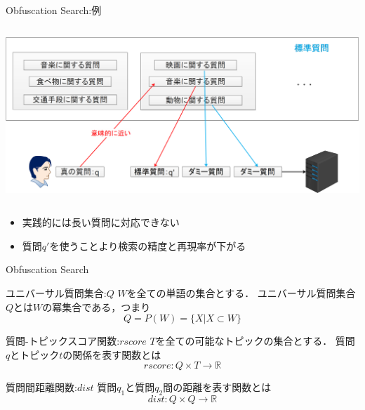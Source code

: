 \documentclass[14pt,xcolor=dvipsnames,table,dvipdfmx]{beamer}
\begin{document}
\begin{frame}{Obfuscation Search:例}
    \begin{columns}[t]
        \begin{column}{1\textwidth} %
            \includegraphics[width=\columnwidth]{rk14.png}
		\end{column}
    \end{columns}
	\begin{block}{} 
		\begin{itemize}
			\item 実践的には長い質問に対応できない
			\item 質問$q'$を使うことより検索の精度と再現率が下がる
		\end{itemize}
	\end{block}
\end{frame}

\begin{frame}{Obfuscation Search}
\fontsize{12pt}{7.2}\selectfont
    \begin{block}{ユニバーサル質問集合:$Q$}
		$W$を全ての単語の集合とする．
		ユニバーサル質問集合$Q$とは$W$の冪集合である，つまり
		\begin{equation}
		Q = P(W) = \{X|X \subset W\}
		\end{equation}
    \end{block}
    \begin{block}{質問-トピックスコア関数:$rscore$}
		$T$を全ての可能なトピックの集合とする．
		質問$q$とトピック$t$の関係を表す関数とは
		\begin{equation}
		rscore:Q \times T \to \mathbb{R}
		\end{equation}
    \end{block}
    \begin{block}{質問間距離関数:$dist$}
		質問$q_1$と質問$q_2$間の距離を表す関数とは
		\begin{equation}
		dist:Q \times Q \to \mathbb{R}
		\end{equation}
    \end{block}
\end{frame}
\end{document}
